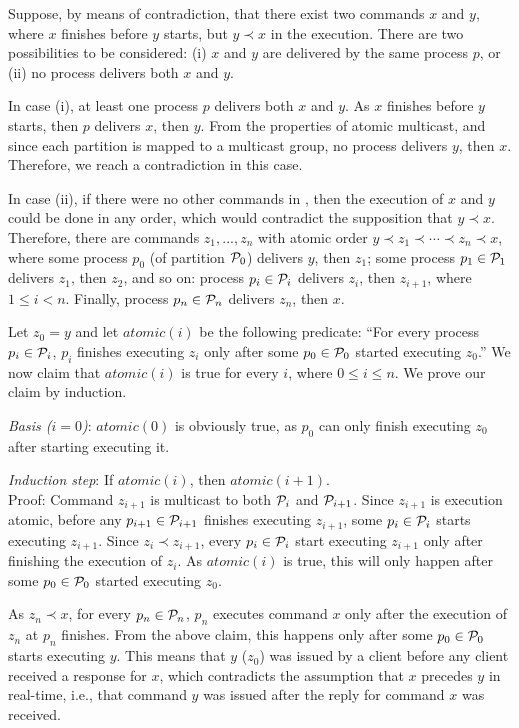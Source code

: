 Suppose, by means of contradiction, that there exist two commands $x$ and $y$, where $x$ finishes before $y$ starts, but $y \prec x$ in the execution.
There are two possibilities to be considered: (i) $x$ and $y$ are delivered by the same process $p$, or (ii) no process delivers both $x$ and $y$.

In case (i), at least one process $p$ delivers both $x$ and $y$.
As $x$ finishes before $y$ starts, then $p$ delivers $x$, then $y$. From the properties of atomic multicast, and since each partition is mapped to a multicast group, no process delivers $y$, then $x$.
Therefore, we reach a contradiction in this case.

In case (ii), if there were no other commands in \ex, then the execution of $x$ and $y$ could be done in any order, which would contradict the supposition that $y \prec x$.
Therefore, there are commands $z_1, ..., z_n$ with atomic order $y \prec z_1 \prec \cdots \prec z_n \prec x$, where some process $p_0$ (of partition $\mathcal{P}_0$) delivers $y$, then $z_1$; some process $p_1 \in \mathcal{P}_1$ delivers $z_1$, then $z_2$, and so on: process $p_i \in \mathcal{P}_i$ delivers $z_{i}$, then $z_{i+1}$, where $1 \leq i < n$.
Finally, process $p_n \in \mathcal{P}_n$ delivers $z_n$, then $x$.

Let $z_0 = y$ and let $atomic(i)$ be the following predicate:
``For every process $p_i \in \mathcal{P}_i$, $p_i$ finishes executing $z_i$ only after some $p_0 \in \mathcal{P}_0$ started executing $z_0$.''
We now claim that $atomic(i)$ is true for every $i$, where $0 \leq i \leq n$.
We prove our claim by induction.


\emph{Basis ($i=0$)}: $atomic(0)$ is obviously true, as $p_0$ can only finish executing $z_0$ after starting executing it.

\emph{Induction step}: If $atomic(i)$, then $atomic(i+1)$.
\\
Proof: Command $z_{i+1}$ is multicast to both $\mathcal{P}_i$ and $\mathcal{P}_{i+1}$. Since $z_{i+1}$ is execution atomic, before any $p_{i+1} \in \mathcal{P}_{i+1}$ finishes executing $z_{i+1}$, some $p_i \in \mathcal{P}_i$ starts executing $z_{i+1}$.
Since $z_i \prec z_{i+1}$, every $p_i \in \mathcal{P}_i$ start executing $z_{i+1}$ only after finishing the execution of $z_i$.
As $atomic(i)$ is true, this will only happen after some $p_0 \in \mathcal{P}_0$ started executing $z_0$.


As $z_n \prec x$, for every $p_n \in \mathcal{P}_n$, $p_n$ executes command $x$ only after the execution of $z_n$ at $p_n$ finishes.
From the above claim, this happens only after some $p_0 \in \mathcal{P}_0$ starts executing $y$.
This means that $y$ ($z_0$) was issued by a client before any client received a response for $x$,
which contradicts the assumption that $x$ precedes $y$ in real-time, i.e., that command $y$ was issued after the reply for command $x$ was received.